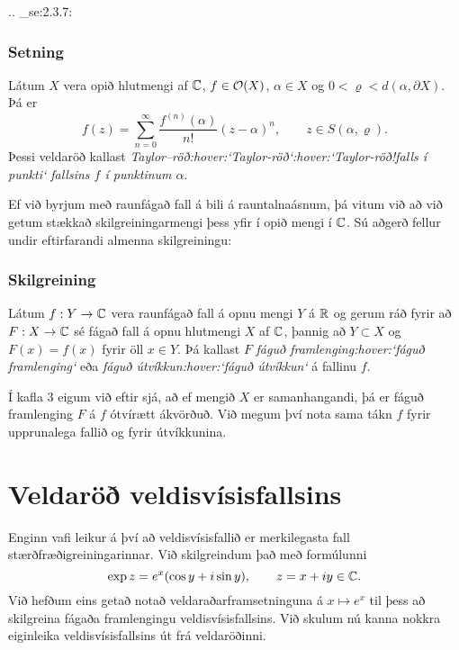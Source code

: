 .. _se:2.3.7:

\subsubsection{Setning}  
Látum $X$ vera opið hlutmengi af ${\mathbb C}$, $f\in {\cal O}(X)$, $\alpha\in
X$ og $0<\varrho<d(\alpha,\partial X)$.  Þá er 
 $$f(z)= \sum\limits_{n=0}^\infty \dfrac
{f^{(n)}(\alpha)}{n!}(z-\alpha)^n, \qquad z\in S(\alpha,\varrho).
 $$
Þessi veldaröð kallast {\it
Taylor--röð:hover:`Taylor-röð`:hover:`Taylor-röð!falls í punkti`
fallsins $f$ í punktinum $\alpha$}.


Ef við byrjum með raunfágað fall á bili á rauntalnaásnum, þá vitum við
að við getum stækkað skilgreiningarmengi þess yfir í opið mengi í ${\mathbb C}$.
Sú aðgerð fellur undir eftirfarandi almenna skilgreiningu:

\subsubsection{Skilgreining}
Látum $f:Y\to {\mathbb C}$ vera raunfágað fall á opnu mengi $Y$ á ${\mathbb R}$
og gerum ráð fyrir að $F:X\to {\mathbb C}$ sé fágað fall á opnu hlutmengi $X$ af
${\mathbb C}$, þannig að $Y\subset X$ og $F(x)=f(x)$ fyrir öll $x\in Y$.  Þá
kallast $F$ {\it fáguð framlenging:hover:`fáguð framlenging`} eða {\it
fáguð útvíkkun:hover:`fáguð útvíkkun`}
á fallinu $f$.  


Í kafla 3 eigum við eftir sjá, að ef mengið $X$ er
samanhangandi,  þá er fáguð framlenging $F$ á $f$ ótvírætt ákvörðuð.
Við megum því nota sama tákn $f$ fyrir upprunalega fallið og
fyrir útvíkkunina.
 
 
\section{Veldaröð veldisvísisfallsins}



\noindent
Enginn vafi leikur á því að veldisvísisfallið er merkilegasta fall
stærðfræðigreiningarinnar.    Við skilgreindum það með formúlunni
$$
\exp z=e^x(\cos y+i\sin y), \qquad z=x+iy \in {\mathbb C}.
$$
Við hefðum eins getað notað veldaraðarframsetninguna á $x\mapsto e^x$
til þess að skilgreina fágaða framlengingu veldisvísisfallsins.
Við skulum nú kanna nokkra eiginleika veldisvísisfallsins út frá
veldaröðinni.   


